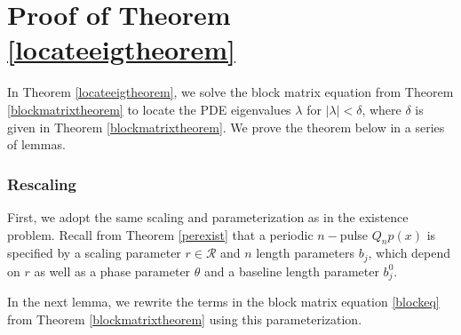 \documentclass[thesis.tex]{subfiles}
\begin{document}
\section{Proof of Theorem \ref{locateeigtheorem}}

In Theorem \ref{locateeigtheorem}, we solve the block matrix equation from Theorem \ref{blockmatrixtheorem} to locate the PDE eigenvalues $\lambda$ for $|\lambda| < \delta$, where $\delta$ is given in Theorem \ref{blockmatrixtheorem}. We prove the theorem below in a series of lemmas. 

\subsubsection{Rescaling}

First, we adopt the same scaling and parameterization as in the existence problem. Recall from Theorem \ref{perexist} that a periodic $n-$pulse $Q_np(x)$ is specified by a scaling parameter $r \in \mathcal{R}$ and $n$ length parameters $b_j$, which depend on $r$ as well as a phase parameter $\theta$ and a baseline length parameter $b_j^0$.

In the next lemma, we rewrite the terms in the block matrix equation \eqref{blockeq} from Theorem \ref{blockmatrixtheorem} using this parameterization.
\end{document}
